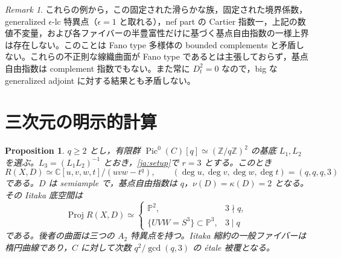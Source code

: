 \documentclass[12pt]{amsart}
\newtheorem{prop}[thm]{Proposition}
\theoremstyle{definition}
\theoremstyle{remark}
\newtheorem{rem}[thm]{Remark}
\numberwithin{equation}{section}
\newcommand{\Z}{\mathbb{Z}}
\newcommand{\C}{\mathbb{C}}
\newcommand{\mP}{\mathbb{P}}
\DeclareMathOperator{\Pic}{Pic}
\DeclareMathOperator{\Proj}{Proj}
\begin{document}
\begin{rem}\label{ja:bounded}
これらの例から，この固定された滑らかな族，固定された境界係数，generalized $\epsilon$-lc 特異点（$\epsilon=1$ と取れる），nef part の Cartier 指数一，上記の数値不変量，および各ファイバーの半豊富性だけに基づく基点自由指数の一様上界は存在しない。このことは Fano type 多様体の bounded complements と矛盾しない。これらの不正則な線織曲面が Fano type であるとは主張しておらず，基点自由指数は complement 指数でもない。また常に $D_t^2=0$ なので，big な generalized adjoint に対する結果とも矛盾しない。
\end{rem}
\section{三次元の明示的計算}\label{ja:three}
\begin{prop}\label{ja:cubic}
$q\geq2$ とし，有限群 $\Pic^0(C)[q]\simeq(\Z/q\Z)^2$ の基底 $L_1,L_2$ を選ぶ。$L_3=(L_1L_2)^{-1}$ とおき，\eqref{ja:setup}で $r=3$ とする。このとき
\begin{equation}\label{ja:cubicring}
 R(X,D)\simeq\C[u,v,w,t]/(uvw-t^q),\qquad
 (\deg u,\deg v,\deg w,\deg t)=(q,q,q,3)
\end{equation}
である。$D$ は semiample で，基点自由指数は $q$，$\nu(D)=\kappa(D)=2$ となる。その Iitaka 底空間は
\begin{equation}\label{ja:bases}
 \Proj R(X,D)\simeq
 \begin{cases}
 \mP^2,&3\nmid q,\\
 \{UVW=S^3\}\subset\mP^3,&3\mid q
 \end{cases}
\end{equation}
である。後者の曲面は三つの $A_2$ 特異点を持つ。Iitaka 縮約の一般ファイバーは楕円曲線であり，$C$ に対して次数 $q^2/\gcd(q,3)$ の \emph{\'etale} 被覆となる。
\end{prop}
\end{document}
